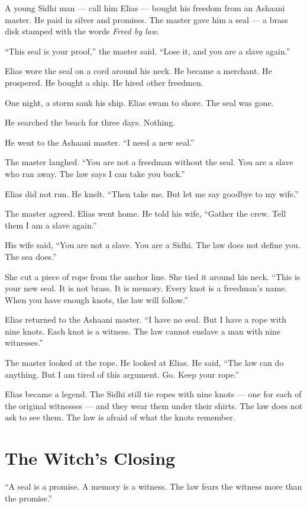 \documentclass[10pt,twoside]{book}
\begin{document}
A young Sidhi man --- call him Elias --- bought his freedom from an Ashaani master. He paid in silver and promises. The master gave him a seal --- a brass disk stamped with the words \textit{Freed by law}.

``This seal is your proof,'' the master said. ``Lose it, and you are a slave again.''

Elias wore the seal on a cord around his neck. He became a merchant. He prospered. He bought a ship. He hired other freedmen.

One night, a storm sank his ship. Elias swam to shore. The seal was gone.

He searched the beach for three days. Nothing.

He went to the Ashaani master. ``I need a new seal.''

The master laughed. ``You are not a freedman without the seal. You are a slave who ran away. The law says I can take you back.''

Elias did not run. He knelt. ``Then take me. But let me say goodbye to my wife.''

The master agreed. Elias went home. He told his wife, ``Gather the crew. Tell them I am a slave again.''

His wife said, ``You are not a slave. You are a Sidhi. The law does not define you. The sea does.''

She cut a piece of rope from the anchor line. She tied it around his neck. ``This is your new seal. It is not brass. It is memory. Every knot is a freedman's name. When you have enough knots, the law will follow.''

Elias returned to the Ashaani master. ``I have no seal. But I have a rope with nine knots. Each knot is a witness. The law cannot enslave a man with nine witnesses.''

The master looked at the rope. He looked at Elias. He said, ``The law can do anything. But I am tired of this argument. Go. Keep your rope.''

Elias became a legend. The Sidhi still tie ropes with nine knots --- one for each of the original witnesses --- and they wear them under their shirts. The law does not ask to see them. The law is afraid of what the knots remember.

\section*{The Witch's Closing}
``A seal is a promise. A memory is a witness. The law fears the witness more than the promise.''
\end{document}
